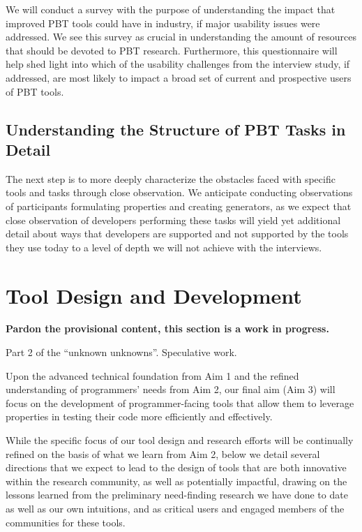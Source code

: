 We will conduct a survey with the purpose of understanding the impact that 
improved PBT tools could have in industry, if major usability issues were 
addressed. We see this survey as crucial in understanding the amount of 
resources that should be devoted to PBT research. Furthermore, this 
questionnaire will help shed light into which of the usability challenges from 
the interview study, if addressed, are most likely to impact a broad set of 
current and prospective users of PBT tools.

\subsection{Understanding the Structure of PBT Tasks in Detail}

The next step is to more deeply characterize the obstacles faced with specific 
tools and tasks through close observation. We anticipate conducting observations 
of participants formulating properties and creating generators, as we expect 
that close observation of developers performing these tasks will yield yet 
additional detail about ways that developers are supported and not supported by 
the tools they use today to a level of depth we will not achieve with the 
interviews.

\section{Tool Design and Development}

\textbf{Pardon the provisional content, this section is a work in progress.}

Part 2 of the ``unknown unknowns''.
Speculative work.

Upon the advanced technical foundation from Aim 1 and the refined understanding 
of programmers' needs from Aim 2, our final aim (Aim 3) will focus on the 
development of programmer-facing tools that allow them to leverage properties in 
testing their code more efficiently and effectively.

While the specific focus of our tool design and research efforts will be 
continually refined on the basis of what we learn from Aim 2, below we detail 
several directions that we expect to lead to the design of tools that are both 
innovative within the research community, as well as potentially impactful, 
drawing on the lessons learned from the preliminary need-finding research we 
have done to date as well as our own intuitions, and as critical users and 
engaged members of the communities for these tools.

